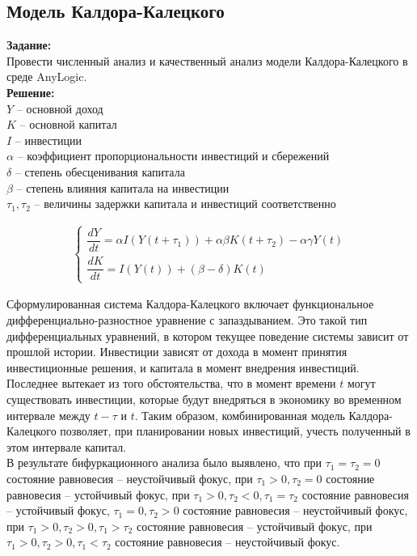 \subsection*{Модель Калдора-Калецкого}

\textbf{Задание:}\\
Провести численный анализ и качественный анализ модели Калдора-Калецкого в среде AnyLogic.\\

\textbf{Решение:}\\
$Y$ -- основной доход\\
$K$ -- основной капитал\\
$I$ -- инвестиции\\
$\alpha$ -- коэффициент пропорциональности инвестиций и сбережений\\
$\delta$ -- степень обесценивания капитала\\
$\beta$ -- степень влияния капитала на инвестиции\\
$\tau_1, \tau_2$ -- величины задержки капитала и инвестиций соответственно

\begin{align*}
	\begin{cases}
		\dfrac{dY}{dt} = \alpha I (Y(t + \tau_1)) + \alpha \beta K (t + \tau_2) - \alpha \gamma Y(t)\\[10pt]
		\dfrac{dK}{dt} = I(Y(t)) + (\beta - \delta) K(t)
	\end{cases}
\end{align*}

Сформулированная система Калдора-Калецкого включает функциональное дифференциально-разностное уравнение с запаздыванием. Это такой тип дифференциальных уравнений, в котором текущее поведение системы зависит от прошлой истории. Инвестиции зависят от дохода в момент принятия инвестиционные решения, и капитала в момент внедрения инвестиций. Последнее вытекает из того обстоятельства, что в момент времени $t$ могут существовать инвестиции, которые будут внедряться в экономику во временном интервале между $t-\tau$ и $t$. Таким образом, комбинированная модель Калдора-Калецкого позволяет, при планировании новых инвестиций, учесть полученный в этом интервале капитал.\\

В результате бифуркационного анализа было выявлено, что при $\tau_1 = \tau_2 = 0$ состояние равновесия -- неустойчивый фокус, при $\tau_1 > 0, \tau_2 = 0$ состояние равновесия -- устойчивый фокус, при $\tau_1 > 0, \tau_2 < 0, \tau_1 = \tau_2$ состояние равновесия -- устойчивый фокус, $\tau_1 = 0, \tau_2 > 0$ состояние равновесия -- неустойчивый фокус, при $\tau_1 > 0, \tau_2 > 0, \tau_1 > \tau_2$ состояние равновесия -- устойчивый фокус, при $\tau_1 > 0, \tau_2 > 0, \tau_1 < \tau_2$ состояние равновесия -- неустойчивый фокус.\\

